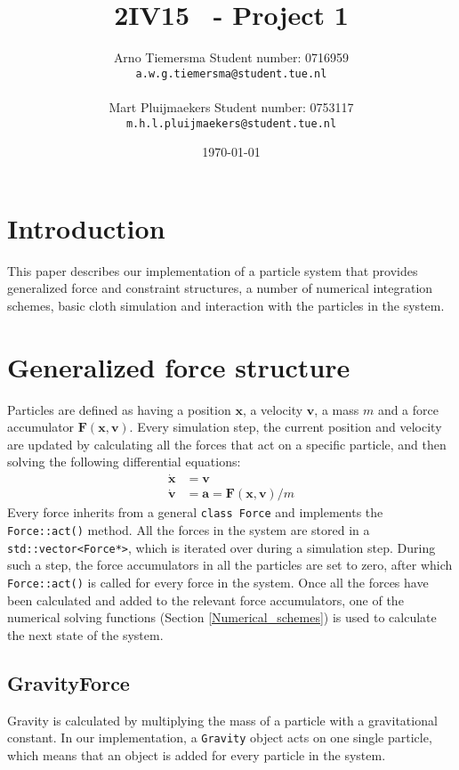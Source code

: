 \documentclass[a4paper,twoside,11pt,twocolumn]{article}
\title{\sffamily\bfseries 2IV15 \scg\ - Project 1}
\author{Arno Tiemersma \qquad Student number: 0716959 \\{\tt a.w.g.tiemersma@student.tue.nl}\\ \\Mart Pluijmaekers \qquad Student number: 0753117 \\{\tt m.h.l.pluijmaekers@student.tue.nl}}
\date{\today}
\begin{document}
\maketitle
\section{Introduction}
This paper describes our implementation of a particle system that provides generalized force and constraint structures, a number of numerical integration schemes, basic cloth simulation and interaction with the particles in the system.

\section{Generalized force structure}
\label{force_structure}
Particles are defined as having a position $\mathbf{x}$, a velocity $\mathbf{v}$, a mass $m$ and a force accumulator $\mathbf{F}(\mathbf{x, v})$. Every simulation step, the current position and velocity are updated by calculating all the forces that act on a specific particle, and then solving the following differential equations:
\begin{align}
	\dot{\mathbf{x}} &= \mathbf{v}\\
	\dot{\mathbf{v}} &= \mathbf{a} = \mathbf{F}(\mathbf{x},\mathbf{v})/m
\end{align}
Every force inherits from a general \texttt{class Force} and implements the \texttt{Force::act()} method. All the forces in the system are stored in a \texttt{std::vector<Force*>}, which is iterated over during a simulation step. During such a step, the force accumulators in all the particles are set to zero, after which \texttt{Force::act()} is called for every force in the system. Once all the forces have been calculated and added to the relevant force accumulators, one of the numerical solving functions (Section \ref{Numerical_schemes}) is used to calculate the next state of the system.
\subsection{GravityForce}
Gravity is calculated by multiplying the mass of a particle with a gravitational constant. In our implementation, a \texttt{Gravity} object acts on one single particle, which means that an object is added for every particle in the system.
\end{document}
